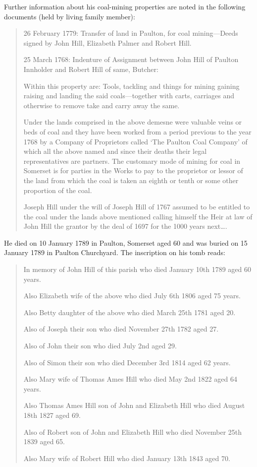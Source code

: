 Further information about his coal-mining properties are noted in the following documents (held by living family member):

\begin{quotation}
26 February 1779: Transfer of land in Paulton, for coal mining---Deeds signed by John Hill, Elizabeth Palmer and Robert Hill.

25 March 1768: Indenture of Assignment between John Hill of Paulton Innholder and Robert Hill of same, Butcher:

Within this property are: Tools, tackling and things for mining gaining raising and landing the said coals---together with carts, carriages and otherwise to remove take and carry away the same.

Under the lands comprised in the above demesne were valuable veins or beds of coal and they have been worked from a period previous to the year 1768 by a Company of Proprietors called `The Paulton Coal Company' of which all the above named and since their deaths their legal representatives are partners.
The customary mode of mining for coal in Somerset is for parties in the Works to pay to the proprietor or lessor of the land from which the coal is taken an eighth or tenth or some other proportion of the coal.

Joseph Hill under the will of Joseph Hill of 1767 assumed to be entitled to the coal under the lands above mentioned calling himself the Heir at law of John Hill the grantor by the deal of 1697 for the 1000 years next\dots.
\end{quotation}

He died on 10 January 1789 in Paulton, Somerset aged 60 and was buried on 15 January 1789 in Paulton Churchyard. The inscription on his tomb reads:

\begin{quotation}
In memory of John Hill of this parish who died January 10th 1789 aged 60 years.

Also Elizabeth wife of the above who died July 6th 1806 aged 75 years.

Also Betty daughter of the above who died March 25th 1781 aged 20.

Also of Joseph their son who died November 27th 1782 aged 27.

Also of John their son who died July 2nd aged 29.

Also of Simon their son who died December 3rd 1814 aged 62 years.

Also Mary wife of Thomas Ames Hill who died May 2nd 1822 aged 64 years.

Also Thomas Ames Hill son of John and Elizabeth Hill who died August 18th 1827 aged 69.

Also of Robert son of John and Elizabeth Hill who died November 25th 1839 aged 65.

Also Mary wife of Robert Hill who died January 13th 1843 aged 70.
\end{quotation}

